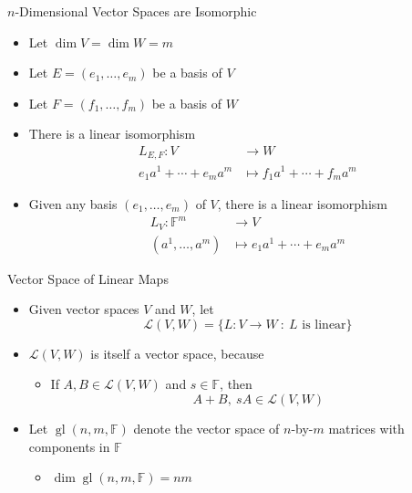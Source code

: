 \documentclass[usenames,dvipsnames,10pt]{beamer}
\newcommand\F{\mathbb{F}}
\newcommand{\gl}{\operatorname{gl}}
\renewcommand{\L}{\mathcal{L}}
\begin{document}
\begin{frame}
  {$n$-Dimensional Vector Spaces are Isomorphic}

  \begin{itemize}
  \item Let $\dim V = \dim W = m$
  \item Let $E = (e_1, \dots, e_m)$ be a basis of $V$
  \item Let $F = (f_1, \dots, f_m)$ be a basis of $W$
  \item There is a linear isomorphism
    \begin{align*}
      L_{E,F}: V &\rightarrow W\\
      e_1a^1+\cdots+e_ma^m &\mapsto f_1a^1+\cdots + f_ma^m
    \end{align*}
  \item Given any basis $(e_1, \dots, e_m)$ of $V$, there is a linear isomorphism
    \begin{align*}
      L_V: \F^m &\rightarrow V\\
      (a^1, \dots, a^m) &\mapsto e_1a^1+ \cdots + e_ma^m
    \end{align*}
  \end{itemize}
\end{frame}

\begin{frame}
  {Vector Space of Linear Maps}

  \begin{itemize}
  \item Given vector spaces $V$ and $W$, let
    \[ \L(V,W) = \{ L: V \rightarrow W\ :\ L\text{ is linear} \} \]
  \item $\L(V,W)$ is itself a vector space, because
    \begin{itemize}
    \item If $A, B \in \L(V,W)$ and $s \in \F$, then
      \[
        A + B,\ sA \in \L(V,W)
      \]
    \end{itemize}
  \item Let $\gl(n,m,\F)$ denote the vector space of $n$-by-$m$ matrices with components in $\F$
    \begin{itemize}
    \item $\dim \gl(n,m,\F) = nm$
    \end{itemize}
  \end{itemize}
\end{frame}
\end{document}
